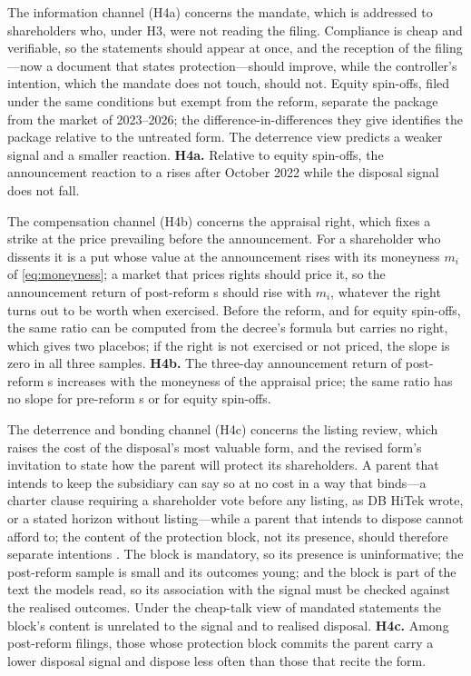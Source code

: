 The information channel (H4a) concerns the mandate, which is addressed to shareholders who, under H3, were not reading the filing. Compliance is cheap and verifiable, so the statements should appear at once, and the reception of the filing---now a document that states protection---should improve, while the controller's intention, which the mandate does not touch, should not. Equity spin-offs, filed under the same conditions but exempt from the reform, separate the package from the market of 2023--2026; the difference-in-differences they give identifies the package relative to the untreated form. The deterrence view predicts a weaker signal and a smaller reaction. \textbf{H4a.} Relative to equity spin-offs, the announcement reaction to a \captive{} rises after October 2022 while the disposal signal does not fall.

The compensation channel (H4b) concerns the appraisal right, which fixes a strike at the price prevailing before the announcement. For a shareholder who dissents it is a put whose value at the announcement rises with its moneyness $m_i$ of \eqref{eq:moneyness}; a market that prices rights should price it, so the announcement return of post-reform \captive{}s should rise with $m_i$, whatever the right turns out to be worth when exercised. Before the reform, and for equity spin-offs, the same ratio can be computed from the decree's formula but carries no right, which gives two placebos; if the right is not exercised or not priced, the slope is zero in all three samples. \textbf{H4b.} The three-day announcement return of post-reform \captive{}s increases with the moneyness of the appraisal price; the same ratio has no slope for pre-reform \captive{}s or for equity spin-offs.

The deterrence and bonding channel (H4c) concerns the listing review, which raises the cost of the disposal's most valuable form, and the revised form's invitation to state how the parent will protect its shareholders. A parent that intends to keep the subsidiary can say so at no cost in a way that binds---a charter clause requiring a shareholder vote before any listing, as DB HiTek wrote, or a stated horizon without listing---while a parent that intends to dispose cannot afford to; the content of the protection block, not its presence, should therefore separate intentions \cite{jensen1976, farrell1996}. The block is mandatory, so its presence is uninformative; the post-reform sample is small and its outcomes young; and the block is part of the text the models read, so its association with the signal must be checked against the realised outcomes. Under the cheap-talk view of mandated statements \cite{benshahar2014} the block's content is unrelated to the signal and to realised disposal. \textbf{H4c.} Among post-reform filings, those whose protection block commits the parent carry a lower disposal signal and dispose less often than those that recite the form.

